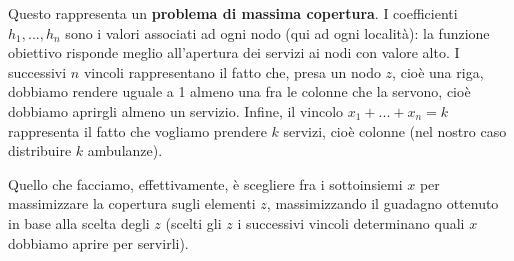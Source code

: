 \documentclass[a4paper,11pt]{article}
\begin{document}
Questo rappresenta un \textbf{problema di massima copertura}.
I coefficienti $h_1, ..., h_n$ sono i valori associati ad ogni nodo (qui ad ogni località): la funzione obiettivo risponde meglio all'apertura dei servizi ai nodi con valore alto.
I successivi $n$ vincoli rappresentano il fatto che, presa un nodo $z$, cioè una riga, dobbiamo rendere uguale a 1 almeno una fra le colonne che la servono, cioè dobbiamo aprirgli almeno un servizio.
Infine, il vincolo $x_1 + ... + x_n =k$ rappresenta il fatto che vogliamo prendere $k$ servizi, cioè colonne (nel nostro caso distribuire $k$ ambulanze).

Quello che facciamo, effettivamente, è scegliere fra i sottoinsiemi $x$ per massimizzare la copertura sugli elementi $z$, massimizzando il guadagno ottenuto in base alla scelta degli $z$ (scelti gli $z$ i successivi vincoli determinano quali $x$ dobbiamo aprire per servirli).
\end{document}
